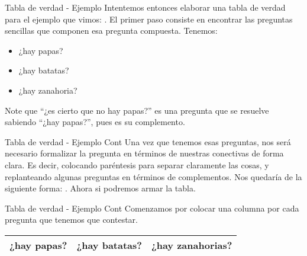 
\begin{frame}{Tabla de verdad - Ejemplo}
  Intentemos entonces elaborar una tabla de verdad para el ejemplo que vimos:
  .
  \jump
  El primer paso consiste en encontrar las preguntas sencillas que componen esa
  pregunta compuesta. Tenemos:
  \begin{itemize}
    \item ¿hay papas?
    \item ¿hay batatas?
    \item ¿hay zanahoria?
  \end{itemize}
  \jump
  Note que ``¿es cierto que no hay papas?'' es una pregunta que se resuelve
  sabiendo ``¿hay papas?'', pues es su complemento.
\end{frame}


\begin{frame}{Tabla de verdad - Ejemplo Cont}
  Una vez que tenemos esas preguntas, nos será necesario formalizar la
  pregunta en términos de nuestras conectivas de forma clara. Es decir,
  colocando paréntesis para separar claramente las cosas, y replanteando
  algunas preguntas en términos de complementos.
  \jump
  Nos quedaría de la siguiente forma:
  \jump
  .
  \jump
  Ahora si podremos armar la tabla.
\end{frame}


\begin{frame}{Tabla de verdad - Ejemplo Cont}
  Comenzamos por colocar una columna por cada pregunta que tenemos que contestar.
  \jump
  \begin{tabular}{c  c  c}
    ¿hay papas? & ¿hay batatas? & ¿hay zanahorias? \\
    \hline
  \end{tabular}
\end{frame}


